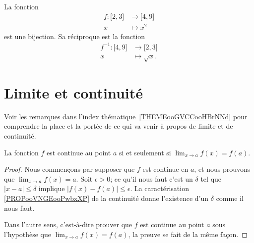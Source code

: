 \begin{example}
	La fonction
	\begin{equation}
		\begin{aligned}
			f\colon \mathopen[ 2 , 3 \mathclose] & \to \mathopen[ 4 , 9 \mathclose] \\
			x                                    & \mapsto x^2
		\end{aligned}
	\end{equation}
	est une bijection. Sa réciproque est la fonction
	\begin{equation}
		\begin{aligned}
			f^{-1}\colon \mathopen[ 4 , 9 \mathclose] & \to \mathopen[ 2 , 3 \mathclose] \\
			x                                         & \mapsto \sqrt{x}.
		\end{aligned}
	\end{equation}
\end{example}

\section{Limite et continuité}
\label{SecLimiteFontion}

Voir les remarques dans l'index thématique~\ref{THEMEooGVCCooHBrNNd} pour comprendre la place et la portée de ce qui va venir à propos de limite et de continuité.

\begin{theorem}           \label{ThoLimCont}
	La fonction \( f\) est continue au point \( a\) si et seulement si \( \lim_{x\to a}f(x)=f(a)\).
\end{theorem}

\begin{proof}
	Nous commençons par supposer que \( f\) est continue en \( a\), et nous prouvons que \( \lim_{x\to a}f(x)=a\). Soit \( \epsilon>0\); ce qu'il nous faut c'est un \( \delta\) tel que \( | x-a |\leq\delta\) implique \( | f(x)-f(a) |\leq\epsilon\). La caractérisation \ref{PROPooVNGEooPwbxXP} de la continuité donne l'existence d'un \( \delta\) comme il nous faut.

	Dans l'autre sens, c'est-à-dire prouver que \( f\) est continue au point \( a\) sous l'hypothèse que \( \lim_{x\to a}f(x)=f(a)\), la preuve se fait de la même façon.
\end{proof}

